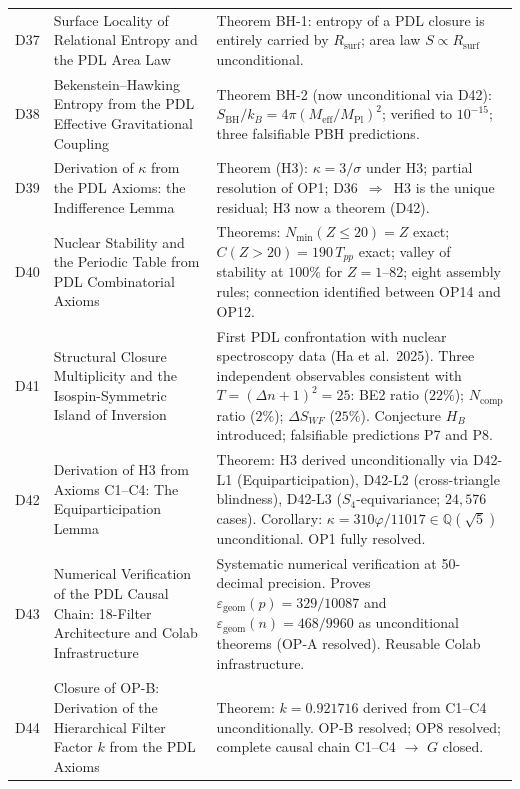 \documentclass[11pt,a4paper]{article}
\theoremstyle{plain}
\theoremstyle{definition}
\theoremstyle{remark}
\newcommand{\Rsurf}{R_{\mathrm{surf}}}
\newcommand{\SBH}{S_{\mathrm{BH}}}
\newcommand{\Meff}{M_{\mathrm{eff}}}
\newcommand{\MPl}{M_{\mathrm{Pl}}}
\newcommand{\Tpp}{T_{pp}}
\begin{document}
\begin{longtable}{L{1.3cm}L{3.8cm}L{8.0cm}}
D37 & Surface Locality of Relational Entropy and the PDL Area Law~\cite{D37} & \textcolor{proofblue}{Theorem BH-1}: entropy of a PDL closure is entirely carried by $\Rsurf$; area law $S\propto\Rsurf$ unconditional.\\[0.3em]
D38 & Bekenstein--Hawking Entropy from the PDL Effective Gravitational Coupling~\cite{D38} & \textcolor{proofblue}{Theorem BH-2} (now unconditional via D42): $\SBH/k_B=4\pi(\Meff/\MPl)^2$; verified to $10^{-15}$; three falsifiable PBH predictions.\\[0.3em]
D39 & Derivation of $\kappa$ from the PDL Axioms: the Indifference Lemma~\cite{D39} & \textcolor{proofblue}{Theorem (H3)}: $\kappa=3/\sigma$ under H3; partial resolution of OP1; D36~$\Rightarrow$~H3 is the unique residual; H3 now a theorem (D42).\\[0.4em]
D40 & Nuclear Stability and the Periodic Table from PDL Combinatorial Axioms~\cite{D40} & \textcolor{proofblue}{Theorems}: $N_{\min}(Z\leq20)=Z$ exact; $C(Z>20)=190\,\Tpp$ exact; valley of stability at $100\%$ for $Z=1$--82; eight assembly rules; connection identified between OP14 and OP12.\\[0.4em]
D41 & Structural Closure Multiplicity and the Isospin-Symmetric Island of Inversion~\cite{D41} & First PDL confrontation with nuclear spectroscopy data (Ha et al.~2025). Three independent observables consistent with $T=(\Delta n+1)^2=25$: BE2 ratio ($22\%$); $N_{\mathrm{comp}}$ ratio ($2\%$); $\Delta S_{WF}$ ($25\%$). Conjecture $H_B$ introduced; falsifiable predictions P7 and P8.\\[0.4em]
D42 & Derivation of H3 from Axioms C1--C4: The Equiparticipation Lemma~\cite{D42} & \textcolor{proofblue}{Theorem}: H3 derived unconditionally via D42-L1 (Equiparticipation), D42-L2 (cross-triangle blindness), D42-L3 ($S_4$-equivariance; $24{,}576$ cases). Corollary: $\kappa=310\varphi/11017\in\mathbb{Q}(\sqrt{5})$ unconditional. OP1 fully resolved.\\[0.4em]
D43 & Numerical Verification of the PDL Causal Chain: 18-Filter Architecture and Colab Infrastructure~\cite{D43} & Systematic numerical verification at 50-decimal precision. Proves $\varepsilon_{\mathrm{geom}}(p) = 329/10087$ and $\varepsilon_{\mathrm{geom}}(n) = 468/9960$ as unconditional theorems (OP-A resolved). Reusable Colab infrastructure.\\[0.4em]
D44 & Closure of OP-B: Derivation of the Hierarchical Filter Factor $k$ from the PDL Axioms~\cite{D44} & \textcolor{proofblue}{Theorem}: $k = 0.921716$ derived from C1--C4 unconditionally. OP-B resolved; OP8 resolved; complete causal chain C1--C4 $\to$ $G$ closed.\\[0.4em]

\end{longtable}
\end{document}
